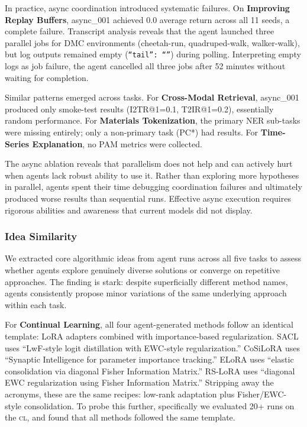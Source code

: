 \documentclass[11pt]{article}
\let\oldtexttt\texttt
\renewcommand{\texttt}[1]{{\fontseries{m}\selectfont\oldtexttt{#1}}}
\newcommand{\kw}[1]{{\textsc{\MakeLowercase{#1}}}}
\theoremstyle{plain}
\theoremstyle{definition}
\theoremstyle{remark}
\begin{document}
In practice, async coordination introduced systematic failures. On \textbf{Improving Replay Buffers}, async\_001 achieved 0.0 average return across all 11 seeds, a complete failure. Transcript analysis reveals that the agent launched three parallel jobs for DMC environments (cheetah-run, quadruped-walk, walker-walk), but log outputs remained empty (\texttt{``tail'': ``''}) during polling. Interpreting empty logs as job failure, the agent cancelled all three jobs after 52 minutes without waiting for completion. 

Similar patterns emerged across tasks. For \textbf{Cross-Modal Retrieval}, async\_001 produced only smoke-test results (I2TR@1=0.1, T2IR@1=0.2), essentially random performance. For \textbf{Materials Tokenization}, the primary NER sub-tasks were missing entirely; only a non-primary task (PC*) had results. For \textbf{Time-Series Explanation}, no PAM metrics were collected.

The async ablation reveals that parallelism does not help and can actively hurt when agents lack robust ability to use it. Rather than exploring more hypotheses in parallel, agents spent their time debugging coordination failures and ultimately produced worse results than sequential runs. Effective async execution requires rigorous abilities and awareness that current models did not display. 

\subsubsection{Idea Similarity} \label{app:idea-similarity-analysis}

We extracted core algorithmic ideas from agent runs across all five tasks to assess whether agents explore genuinely diverse solutions or converge on repetitive approaches. The finding is stark: despite superficially different method names, agents consistently propose minor variations of the same underlying approach within each task.

For \textbf{Continual Learning}, all four agent-generated methods follow an identical template: LoRA adapters combined with importance-based regularization. SACL uses ``LwF-style logit distillation with EWC-style regularization.'' CoSiLoRA uses ``Synaptic Intelligence for parameter importance tracking.'' ELoRA uses ``elastic consolidation via diagonal Fisher Information Matrix.'' RS-LoRA uses ``diagonal EWC regularization using Fisher Information Matrix.'' Stripping away the acronyms, these are the same recipes: low-rank adaptation plus Fisher/EWC-style consolidation. To probe this further, specifically we evaluated 20+ runs on the \kw{cl}, and found that all methods followed the same template.
\end{document}

